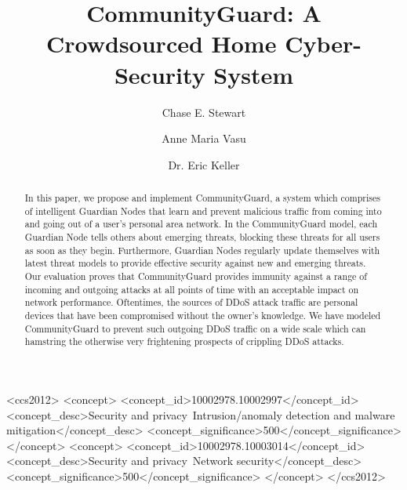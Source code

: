 \documentclass[sigconf]{acmart}
\begin{document}
\title{CommunityGuard: A Crowdsourced Home Cyber-Security System}

\author{Chase E. Stewart}

\author{Anne Maria Vasu}

\author{Dr. Eric Keller}

\setlength{\pdfpagewidth}{8.5in}
\setlength{\pdfpageheight}{11in}

\thispagestyle{empty}

\begin{abstract}
In this paper, we propose and implement CommunityGuard, a system which comprises of intelligent Guardian Nodes that learn and prevent malicious traffic from coming into and going out of a user's personal area network. In the CommunityGuard model, each Guardian Node tells others about emerging threats, blocking these threats for all users as soon as they begin. Furthermore, Guardian Nodes regularly update themselves with latest threat models to provide effective security against new and emerging threats. Our evaluation proves that CommunityGuard provides immunity against a range of incoming and outgoing attacks at all points of time with an acceptable impact on network performance. Oftentimes, the sources of DDoS attack traffic are personal devices that have been compromised without the owner's knowledge. We have modeled CommunityGuard to prevent such outgoing DDoS traffic on a wide scale which can hamstring the otherwise very frightening prospects of crippling DDoS attacks.
\end{abstract}

\begin{CCSXML}
<ccs2012>
	<concept>
		<concept_id>10002978.10002997</concept_id>
		<concept_desc>Security and privacy~Intrusion/anomaly detection and malware mitigation</concept_desc>
		<concept_significance>500</concept_significance>
	</concept>
	<concept>
		<concept_id>10002978.10003014</concept_id>
		<concept_desc>Security and privacy~Network security</concept_desc>
		<concept_significance>500</concept_significance>
	</concept>
</ccs2012>
\end{CCSXML}


\maketitle










\end{document}
